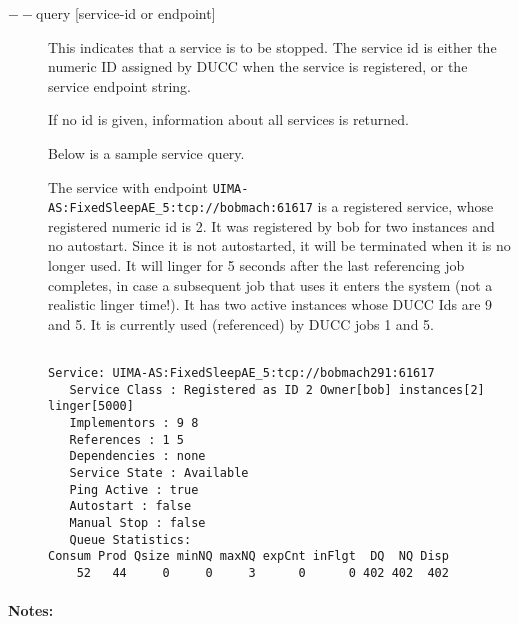     \begin{description}
    \item[$--$query {[service-id or endpoint]}] This indicates that a service is to be stopped. The
      service id is either the numeric ID assigned by DUCC when the service is registered, or the
      service endpoint string.

      If no id is given, information about all services is returned. 

      Below is a sample service query.

      The service with endpoint {\tt UIMA-AS:FixedSleepAE\_5:tcp://bobmach:61617} is a 
      registered service, whose registered numeric id is 2. It was registered by bob for two instances and 
      no autostart. Since it is not autostarted, it will be terminated when it is no longer used. It 
      will linger for 5 seconds after the last referencing job completes, in case a subsequent job 
      that uses it enters the system (not a realistic linger time!). It has two active
      instances whose DUCC Ids are 9 and 5. It is currently used (referenced) 
      by DUCC jobs 1 and 5. 


\begin{verbatim}

Service: UIMA-AS:FixedSleepAE_5:tcp://bobmach291:61617 
   Service Class : Registered as ID 2 Owner[bob] instances[2] linger[5000] 
   Implementors : 9 8 
   References : 1 5 
   Dependencies : none 
   Service State : Available 
   Ping Active : true 
   Autostart : false 
   Manual Stop : false 
   Queue Statistics: 
Consum Prod Qsize minNQ maxNQ expCnt inFlgt  DQ  NQ Disp 
    52   44     0     0     3      0      0 402 402  402 
\end{verbatim}
    \end{description}
    \paragraph{Notes:}

